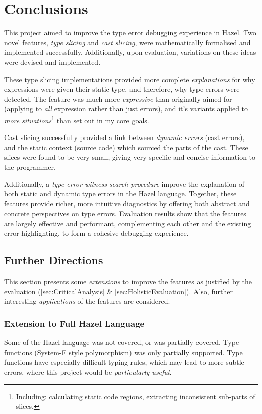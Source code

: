 \chapter{Conclusions}\label{chap:Conclusions}
This project aimed to improve the type error debugging experience in Hazel. Two novel features, \textit{type slicing} and \textit{cast slicing}, were mathematically formalised and implemented successfully. Additionally, upon evaluation, variations on these ideas were devised and implemented. 

These type slicing implementations provided more complete \textit{explanations} for why expressions were given their static type, and therefore, why type errors were detected. The feature was much more \textit{expressive} than originally aimed for (applying to \textit{all} expression rather than just errors), and it's variants applied to \textit{more situations}\footnote{Including: calculating static code regions, extracting inconsistent sub-parts of slices.} than set out in my core goals.

Cast slicing successfully provided a link between \textit{dynamic errors} (cast errors), and the static context (source code) which sourced the parts of the cast. These slices were found to be very small, giving very specific and concise information to the programmer.

Additionally, a \textit{type error witness search procedure}  improve the explanation of both static and dynamic type errors in the Hazel language. Together, these features provide richer, more intuitive diagnostics by offering both abstract and concrete perspectives on type errors. Evaluation results show that the features are largely effective and performant, complementing each other and the existing error highlighting, to form a cohesive debugging experience. 


\section{Further Directions}
This section presents some \textit{extensions} to improve the features as justified by the evaluation (\cref{sec:CriticalAnalysis} \& \ref{sec:HolisticEvaluation}). Also, further interesting \textit{applications} of the features are considered.

\subsection{Extension to Full Hazel Language}
Some of the Hazel language was not covered, or was partially covered. Type functions (System-F style polymorphism) was only partially supported. Type functions have especially difficult typing rules, which may lead to more subtle errors, where this project would be \textit{particularly useful}. 

